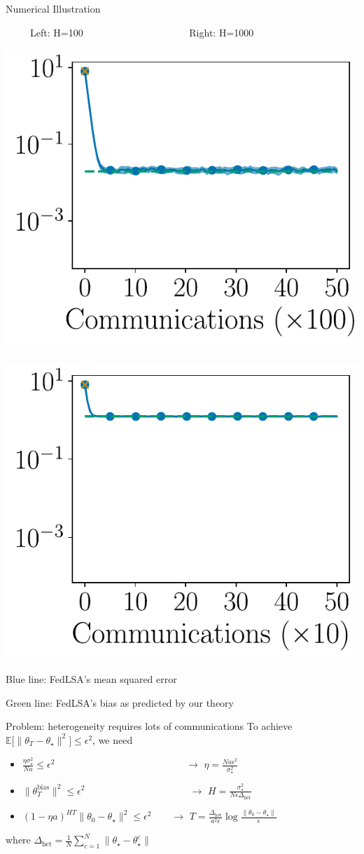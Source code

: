 \documentclass[aspectratio=169,14pt]{beamer}
\begin{document}
\begin{frame}{Numerical Illustration}
  \vspace{-0.5em}
  
  \begin{center}
    ~~~~~Left: H=100~~~~~~~~~~~~~~~~~~~~~
    Right: H=1000
 
    \vspace{-1em}
   
    \includegraphics[width=0.4\linewidth]{images/plot_hg_100_n100_fedlsa.pdf}
    ~~
    \includegraphics[width=0.4\linewidth]{images/plot_hg_1000_n100_fedlsa.pdf}
  \end{center}

  \vspace{-1em}

  Blue line: FedLSA's mean squared error

  \vspace{-1em}

  Green line: FedLSA's bias as predicted by our theory
\end{frame}


\begin{frame}{Problem: heterogeneity requires lots of communications}
  To achieve $\mathbb{E} \Big[ \| {\theta_T - \theta_\star} \|^2 \Big] \le \epsilon^2$, we need
  \begin{itemize}
  \item $\frac{\eta \sigma_\star^2}{N a} \le \epsilon^2$ ~~~~~~\,~~~~~~~~~~~~~~~~~~~ $\rightarrow$ $\eta = \frac{N a \epsilon^2}{\sigma_\star^2}$
  \item $\| \theta_T^{\text{bias}} \|^2 \le \epsilon^2$ ~~~~~~~~~~~~~~~~~~~~ $\rightarrow$ $H = \frac{\sigma_\star^2 }{N \epsilon \Delta_{\text{het}}}$
  \item $(1 - \eta a)^{H T} \| \theta_0 - \theta_\star \|^2 \le \epsilon^2$ ~~~\,$\rightarrow$ $T = \frac{\Delta_{\text{het}}}{a^2 \epsilon} \log \tfrac{\| \theta_0 - \theta_\star \|}{ \epsilon }$
  \end{itemize}

  where $\Delta_{\text{het}} = \frac{1}{N} \sum_{c=1}^N \| \theta_\star - \theta_\star^c \| $
\end{frame}
\end{document}
